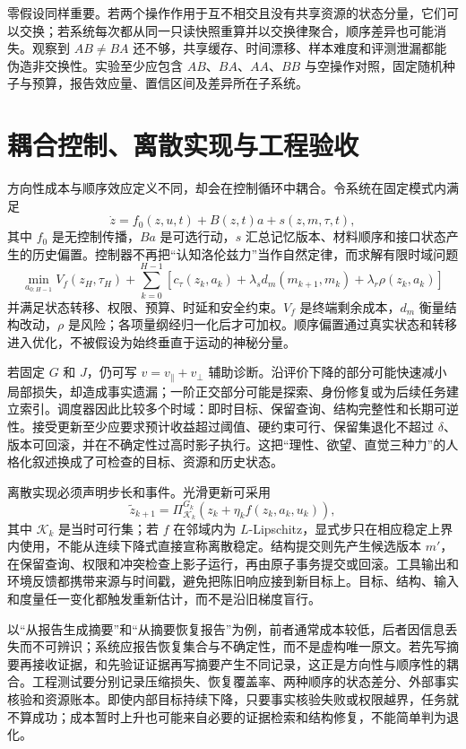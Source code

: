 零假设同样重要。若两个操作作用于互不相交且没有共享资源的状态分量，它们可以交换；若系统每次都从同一只读快照重算并以交换律聚合，顺序差异也可能消失。观察到 $AB\neq BA$ 还不够，共享缓存、时间漂移、样本难度和评测泄漏都能伪造非交换性。实验至少应包含 $AB$、$BA$、$AA$、$BB$ 与空操作对照，固定随机种子与预算，报告效应量、置信区间及差异所在子系统。

\section{耦合控制、离散实现与工程验收}
\label{sec:cognitive_lorentz_force}

方向性成本与顺序效应定义不同，却会在控制循环中耦合。令系统在固定模式内满足
\[
\dot z=f_0(z,u,t)+B(z,t)a+s(z,m,\tau,t),
\]
其中 $f_0$ 是无控制传播，$Ba$ 是可选行动，$s$ 汇总记忆版本、材料顺序和接口状态产生的历史偏置。控制器不再把“认知洛伦兹力”当作自然定律，而求解有限时域问题
\[
\min_{a_{0:H-1}}V_f(z_H,\tau_H)+\sum_{k=0}^{H-1}
[c_\tau(z_k,a_k)+\lambda_s d_m(m_{k+1},m_k)+\lambda_r\rho(z_k,a_k)]
\]
并满足状态转移、权限、预算、时延和安全约束。$V_f$ 是终端剩余成本，$d_m$ 衡量结构改动，$\rho$ 是风险；各项量纲经归一化后才可加权。顺序偏置通过真实状态和转移进入优化，不被假设为始终垂直于运动的神秘分量。

若固定 $G$ 和 $J$，仍可写 $v=v_{\parallel}+v_{\perp}$ 辅助诊断。沿评价下降的部分可能快速减小局部损失，却造成事实遗漏；一阶正交部分可能是探索、身份修复或为后续任务建立索引。调度器因此比较多个时域：即时目标、保留查询、结构完整性和长期可逆性。接受更新至少应要求预计收益超过阈值、硬约束可行、保留集退化不超过 $\delta$、版本可回滚，并在不确定性过高时影子执行。这把“理性、欲望、直觉三种力”的人格化叙述换成了可检查的目标、资源和历史状态。

离散实现必须声明步长和事件。光滑更新可采用
\[
\tilde z_{k+1}=\Pi_{\mathcal K_k}^{G_k}(z_k+\eta_k f(z_k,a_k,u_k)),
\]
其中 $\mathcal K_k$ 是当时可行集；若 $f$ 在邻域内为 $L$-Lipschitz，显式步只在相应稳定上界内使用，不能从连续下降式直接宣称离散稳定。结构提交则先产生候选版本 $m'$，在保留查询、权限和冲突检查上影子运行，再由原子事务提交或回滚。工具输出和环境反馈都携带来源与时间戳，避免把陈旧响应接到新目标上。目标、结构、输入和度量任一变化都触发重新估计，而不是沿旧梯度盲行。

以“从报告生成摘要”和“从摘要恢复报告”为例，前者通常成本较低，后者因信息丢失而不可辨识；系统应报告恢复集合与不确定性，而不是虚构唯一原文。若先写摘要再接收证据，和先验证证据再写摘要产生不同记录，这正是方向性与顺序性的耦合。工程测试要分别记录压缩损失、恢复覆盖率、两种顺序的状态差分、外部事实核验和资源账本。即使内部目标持续下降，只要事实核验失败或权限越界，任务就不算成功；成本暂时上升也可能来自必要的证据检索和结构修复，不能简单判为退化。

